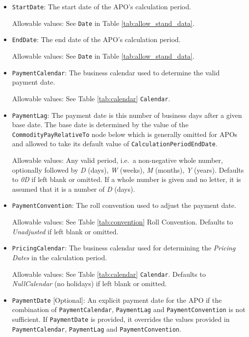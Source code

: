 \begin{itemize}
\item \lstinline!StartDate!: The start date of the APO's calculation period.

Allowable values:  See \lstinline!Date! in Table \ref{tab:allow_stand_data}.

\item \lstinline!EndDate!: The end date of the APO's calculation period.

Allowable values:  See \lstinline!Date! in Table \ref{tab:allow_stand_data}.

\item \lstinline!PaymentCalendar!: The business calendar used to determine the valid payment date.

Allowable values: See Table \ref{tab:calendar} \lstinline!Calendar!. 

\item \lstinline!PaymentLag!: The payment date is this number of business days after a given base date. The base date is determined by the value of the \lstinline!CommodityPayRelativeTo! node below which is generally omitted for APOs and allowed to take its default value of \lstinline!CalculationPeriodEndDate!.

Allowable values: Any valid period, i.e.\ a non-negative whole number, optionally followed by \emph{D} (days), \emph{W} (weeks), \emph{M} (months),
  \emph{Y} (years). Defaults to \emph{0D} if left blank or omitted. If a whole number is given and no letter, it is assumed that it is a number of  \emph{D} (days).


\item \lstinline!PaymentConvention!: The roll convention used to adjust the payment date.

Allowable values: See Table \ref{tab:convention} Roll Convention. Defaults to \emph{Unadjusted} if left blank or omitted.

\item \lstinline!PricingCalendar!: The business calendar used for determining the \textit{Pricing Dates} in the calculation period.

Allowable values: See Table \ref{tab:calendar} \lstinline!Calendar!. Defaults to \emph{NullCalendar} (no holidays) if left blank or omitted.

\item \lstinline!PaymentDate! [Optional]: An explicit payment date for the APO if the combination of \lstinline!PaymentCalendar!, \lstinline!PaymentLag! and \lstinline!PaymentConvention! is not sufficient. If \lstinline!PaymentDate! is provided, it overrides the values provided in \lstinline!PaymentCalendar!, \lstinline!PaymentLag! and \lstinline!PaymentConvention!.


\end{itemize}
